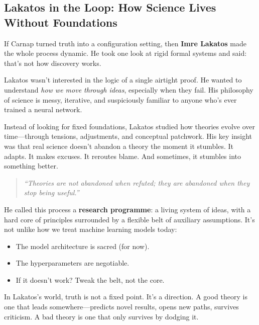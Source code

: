 \subsection{Lakatos in the Loop: How Science Lives Without Foundations}

If Carnap turned truth into a configuration setting, then \textbf{Imre Lakatos} made the whole process dynamic. He took one look at rigid formal systems and said: that’s not how discovery works.

Lakatos wasn’t interested in the logic of a single airtight proof. He wanted to understand \textit{how we move through ideas}, especially when they fail. His philosophy of science is messy, iterative, and suspiciously familiar to anyone who's ever trained a neural network.

Instead of looking for fixed foundations, Lakatos studied how theories evolve over time—through tensions, adjustments, and conceptual patchwork. His key insight was that real science doesn’t abandon a theory the moment it stumbles. It adapts. It makes excuses. It reroutes blame. And sometimes, it stumbles into something better.

\begin{quote}
    \textit{“Theories are not abandoned when refuted; they are abandoned when they stop being useful.”}
\end{quote}

He called this process a \textbf{research programme}: a living system of ideas, with a hard core of principles surrounded by a flexible belt of auxiliary assumptions. It’s not unlike how we treat machine learning models today:

\begin{itemize}
  \item The model architecture is sacred (for now).
  \item The hyperparameters are negotiable.
  \item If it doesn’t work? Tweak the belt, not the core.
\end{itemize}

In Lakatos’s world, truth is not a fixed point. It’s a direction. A good theory is one that leads somewhere—predicts novel results, opens new paths, survives criticism. A bad theory is one that only survives by dodging it.

\vspace{1em}

